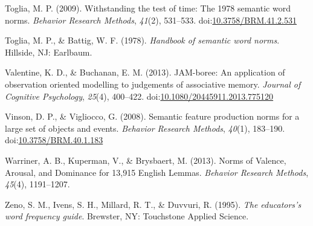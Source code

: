 \documentclass[english,man]{apa6}
\theoremstyle{definition}
\theoremstyle{definition}
\theoremstyle{remark}
\begin{document}
\hypertarget{ref-Toglia2009}{}
Toglia, M. P. (2009). Withstanding the test of time: The 1978 semantic
word norms. \emph{Behavior Research Methods}, \emph{41}(2), 531--533.
doi:\href{https://doi.org/10.3758/BRM.41.2.531}{10.3758/BRM.41.2.531}

\hypertarget{ref-Toglia1978}{}
Toglia, M. P., \& Battig, W. F. (1978). \emph{Handbook of semantic word
norms}. Hillside, NJ: Earlbaum.

\hypertarget{ref-Valentine2013}{}
Valentine, K. D., \& Buchanan, E. M. (2013). JAM-boree: An application
of observation oriented modelling to judgements of associative memory.
\emph{Journal of Cognitive Psychology}, \emph{25}(4), 400--422.
doi:\href{https://doi.org/10.1080/20445911.2013.775120}{10.1080/20445911.2013.775120}

\hypertarget{ref-Vinson2008}{}
Vinson, D. P., \& Vigliocco, G. (2008). Semantic feature production
norms for a large set of objects and events. \emph{Behavior Research
Methods}, \emph{40}(1), 183--190.
doi:\href{https://doi.org/10.3758/BRM.40.1.183}{10.3758/BRM.40.1.183}

\hypertarget{ref-Warriner2013}{}
Warriner, A. B., Kuperman, V., \& Brysbaert, M. (2013). Norms of
Valence, Arousal, and Dominance for 13,915 English Lemmas.
\emph{Behavior Research Methods}, \emph{45}(4), 1191--1207.

\hypertarget{ref-Zeno1995}{}
Zeno, S. M., Ivens, S. H., Millard, R. T., \& Duvvuri, R. (1995).
\emph{The educators's word frequency guide}. Brewster, NY: Touchstone
Applied Science.
\end{document}
